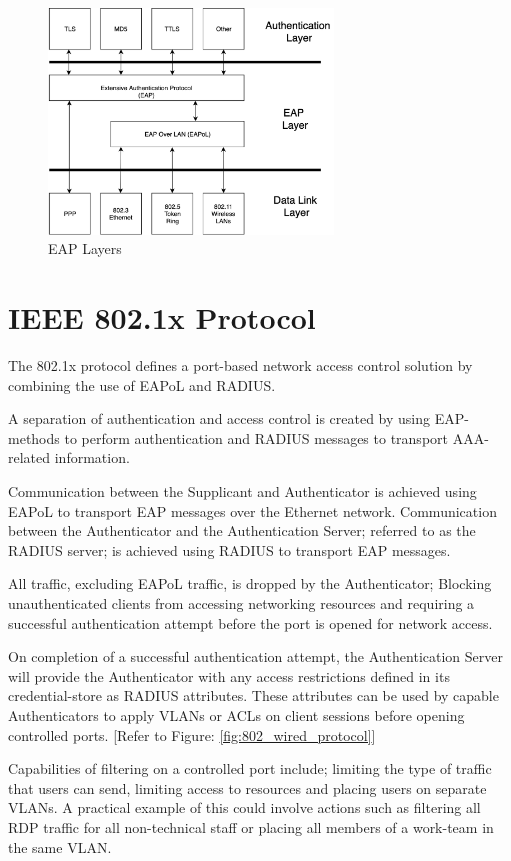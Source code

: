 \begin{figure}\begin{center}
    \includegraphics[height=6cm]{images/eap_layers_diagram.png}
    \caption{EAP Layers}
    \label{fig:EAP_layers}
\end{center}\end{figure}

\section{IEEE 802.1x Protocol}
The 802.1x protocol defines a port-based network access control solution by combining the use of EAPoL and RADIUS.

A separation of authentication and access control is created by using EAP-methods to perform authentication and RADIUS messages to transport AAA-related information.

Communication between the Supplicant and Authenticator is achieved using EAPoL to transport EAP messages over the Ethernet network. Communication between the Authenticator and the Authentication Server; referred to as the RADIUS server; is achieved using RADIUS to transport EAP messages.

All traffic, excluding EAPoL traffic, is dropped by the Authenticator; Blocking unauthenticated clients from accessing networking resources and requiring a successful authentication attempt before the port is opened for network access.

On completion of a successful authentication attempt, the Authentication Server will provide the Authenticator with any access restrictions defined in its credential-store as RADIUS attributes. These attributes can be used by capable Authenticators to apply VLANs or ACLs on client sessions before opening controlled ports. [Refer to Figure: \ref{fig:802_wired_protocol}]

Capabilities of filtering on a controlled port include; limiting the type of traffic that users can send, limiting access to resources and placing users on separate VLANs. A practical example of this could involve actions such as filtering all RDP traffic for all non-technical staff or placing all members of a work-team in the same VLAN.

